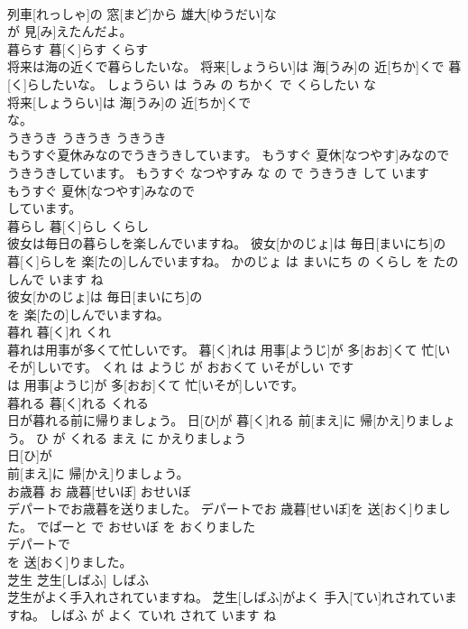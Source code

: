 \documentclass[8pt]{extreport}
\begin{document}
\begin{CJK}{UTF8}{min}
\\	列車[れっしゃ]の 窓[まど]から 雄大[ゆうだい]な
\\	が 見[み]えたんだよ。			
\\	暮らす	暮[く]らす	くらす	
\\	将来は海の近くで暮らしたいな。	将来[しょうらい]は 海[うみ]の 近[ちか]くで 暮[く]らしたいな。	しょうらい は うみ の ちかく で くらしたい な	
\\	将来[しょうらい]は 海[うみ]の 近[ちか]くで
\\	な。			
\\	うきうき	うきうき	うきうき	
\\	もうすぐ夏休みなのでうきうきしています。	もうすぐ 夏休[なつやす]みなのでうきうきしています。	もうすぐ なつやすみ な の で うきうき して います	
\\	もうすぐ 夏休[なつやす]みなので
\\	しています。			
\\	暮らし	暮[く]らし	くらし	
\\	彼女は毎日の暮らしを楽しんでいますね。	彼女[かのじょ]は 毎日[まいにち]の 暮[く]らしを 楽[たの]しんでいますね。	かのじょ は まいにち の くらし を たのしんで います ね	
\\	彼女[かのじょ]は 毎日[まいにち]の
\\	を 楽[たの]しんでいますね。			
\\	暮れ	暮[く]れ	くれ	
\\	暮れは用事が多くて忙しいです。	暮[く]れは 用事[ようじ]が 多[おお]くて 忙[いそが]しいです。	くれ は ようじ が おおくて いそがしい です	
\\	は 用事[ようじ]が 多[おお]くて 忙[いそが]しいです。			
\\	暮れる	暮[く]れる	くれる	
\\	日が暮れる前に帰りましょう。	日[ひ]が 暮[く]れる 前[まえ]に 帰[かえ]りましょう。	ひ が くれる まえ に かえりましょう	
\\	日[ひ]が
\\	前[まえ]に 帰[かえ]りましょう。			
\\	お歳暮	お 歳暮[せいぼ]	おせいぼ	
\\	デパートでお歳暮を送りました。	デパートでお 歳暮[せいぼ]を 送[おく]りました。	でぱーと で おせいぼ を おくりました	
\\	デパートで
\\	を 送[おく]りました。			
\\	芝生	芝生[しばふ]	しばふ	
\\	芝生がよく手入れされていますね。	芝生[しばふ]がよく 手入[てい]れされていますね。	しばふ が よく ていれ されて います ね	

\end{CJK}
\end{document}
